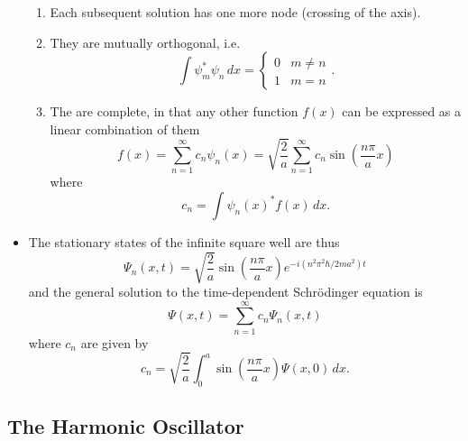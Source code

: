 \documentclass{article}
\begin{document}
\begin{itemize}
\begin{enumerate}
          \item Each subsequent solution has one more node (crossing of the axis).

          \item They are mutually orthogonal, i.e. \[\int \psi_m^* \psi_n \,d x = \begin{cases}
                    0 & m \ne n \\
                    1 & m = n
                  \end{cases}.\]

          \item The are complete, in that any other function $f(x)$ can be expressed as a linear combination of them \[f(x) = \sum_{n = 1}^\infty c_n \psi_n(x) = \sqrt{\frac{2}{a}} \sum_{n = 1}^\infty c_n \sin \left( \frac{n \pi}{a} x \right)\] where \[c_n = \int \psi_n(x)^* f(x) \,d x.\]
        \end{enumerate}

  \item The stationary states of the infinite square well are thus \[\Psi_n(x, t) = \sqrt{\frac{2}{a}} \sin \left( \frac{n \pi}{a} x \right) e^{-i (n^2 \pi^2 \hbar / 2 m a^2) t}\] and the general solution to the time-dependent Schrödinger equation is \[\Psi(x, t) = \sum_{n = 1}^\infty c_n \Psi_n(x, t)\] where $c_n$ are given by \[c_n = \sqrt{\frac{2}{a}} \int_0^a \sin \left( \frac{n \pi}{a} x \right) \Psi(x, 0) \,d x.\]
\end{itemize}

\subsection{The Harmonic Oscillator}
\end{document}
